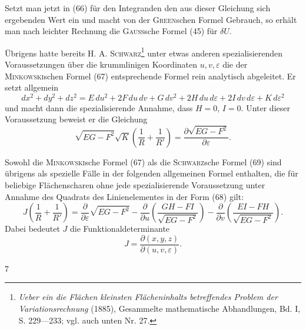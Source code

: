 Setzt man jetzt in (66) für den Integranden den aus dieser Gleichung
sich ergebenden Wert ein und macht von der \textsc{Green}schen Formel Gebrauch,
so erhält man nach leichter Rechnung die \textsc{Gauss}sche Formel (45) für $\delta U$.

Übrigens hatte bereits H. A. \textsc{Schwarz}\footnote{\textit{Ueber ein die Flächen kleinsten Flächeninhalts betreffendes Problem der Variationsrechnung} (1885),
Gesammelte mathematische Abhandlungen, Bd. I, S. 229—233; vgl. auch unten Nr. 27.} unter etwas anderen spezialisierenden
Voraussetzungen über die krummlinigen Koordinaten $u,v,\varepsilon$ die der
\textsc{Minkowski}schen Formel (67) entsprechende Formel rein analytisch abgeleitet.
Er setzt allgemein
\begin{equation*}\tag{68}
dx^2+dy^2+dz^2=E\,du^2+2F\,du\,dv+G\,dv^2+2H\,du\,d\varepsilon+2I\,dv\,d\varepsilon+K\,d\varepsilon^2
\end{equation*}
und macht dann die spezialisierende Annahme, dass $H=0$, $I=0$. Unter
dieser Voraussetzung beweist er die Gleichung
\begin{equation*}\tag{69}
\sqrt{EG-F^2}\sqrt K\left(\frac{1}{R}+\frac{1}{R'}\right)
=\frac{\partial\sqrt{EG-F^2}}{\partial\varepsilon}.
\end{equation*}

Sowohl die \textsc{Minkowski}sche Formel (67) als die \textsc{Schwarz}sche Formel (69)
sind übrigens als spezielle Fälle in der folgenden allgemeinen Formel enthalten,
die für beliebige Flächenscharen ohne jede spezialisierende Voraussetzung
unter Annahme des Quadrats des Linienelementes in der Form (68)
gilt:
\begin{equation*}\tag{70}
J\left(\frac{1}{R}+\frac{1}{R'}\right)
=\frac{\partial}{\partial\varepsilon}\sqrt{EG-F^2}
-\frac{\partial}{\partial u}\left(\frac{GH-FI}{\sqrt{EG-F^2}}\right)
-\frac{\partial}{\partial v}\left(\frac{EI-FH}{\sqrt{EG-F^2}}\right).
\end{equation*}
Dabei bedeutet $J$ die Funktionaldeterminante
\[
J=\frac{\partial(x,y,z)}{\partial(u,v,\varepsilon)}.
\]
\par\smallskip{}\hfill{\small 7}\par
\clearpage\endgroup
